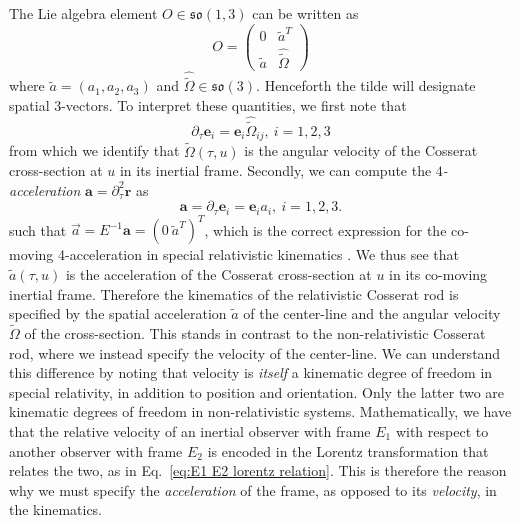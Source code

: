 The Lie algebra element $O \in \mathfrak{so}(1,3)$ can be written as
\begin{equation}
O = \begin{pmatrix}
0 & \tilde{a}^T \\
\tilde{a} & \hat{\tilde{\Omega}}
\end{pmatrix}
\end{equation}
where $\tilde{a} = (a_1, a_2, a_3)$ and $\hat{\tilde{\Omega}} \in \mathfrak{so}(3)$. Henceforth the tilde will designate spatial $3$-vectors. To interpret these quantities, we first note that
\begin{equation}
\partial_\tau \mathbf{e}_i = \mathbf{e}_i \hat{\tilde{\Omega}}_{ij},\ i=1,2,3
\end{equation}
from which we identify that $\tilde{\Omega}(\tau, u)$ is the angular velocity of the Cosserat cross-section at $u$ in its inertial frame. Secondly, we can compute the \textit{$4$-acceleration} $\mathbf{a} = \partial_\tau^2 \mathbf{r}$ as
\begin{equation} \label{eq:4-acceleration}
\mathbf{a} = \partial_\tau \mathbf{e}_i = \mathbf{e}_i a_i,\ i=1,2,3.
\end{equation}
such that $\vec{a} = E^{-1} \mathbf{a} = (0\ \tilde{a}^T)^T$, which is the correct expression for the co-moving 4-acceleration in special relativistic kinematics \citep[p.~99]{rindlerRelativitySpecialGeneral2001}. We thus see that $\tilde{a}(\tau, u)$ is the acceleration of the Cosserat cross-section at $u$ in its co-moving inertial frame. Therefore the kinematics of the relativistic Cosserat rod is specified by the spatial acceleration $\tilde{a}$ of the center-line and the angular velocity $\tilde{\Omega}$ of the cross-section. This stands in contrast to the non-relativistic Cosserat rod, where we instead specify the velocity of the center-line. We can understand this difference by noting that velocity is \emph{itself} a kinematic degree of freedom in special relativity, in addition to position and orientation. Only the latter two are kinematic degrees of freedom in non-relativistic systems. Mathematically, we have that the relative velocity of an inertial observer with frame $E_1$ with respect to another observer with frame $E_2$ is encoded in the Lorentz transformation that relates the two, as in Eq.~\ref{eq:E1 E2 lorentz relation}. This is therefore the reason why we must specify the \emph{acceleration} of the frame, as opposed to its \emph{velocity}, in the kinematics.

